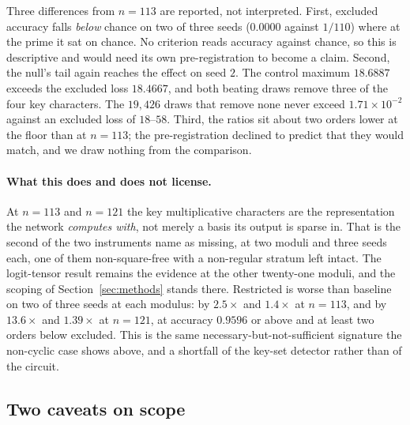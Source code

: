Three differences from $n = 113$ are reported, not interpreted. First, excluded accuracy falls
\emph{below} chance on two of three seeds ($0.0000$ against $1/110$) where at the prime it sat
on chance. No criterion reads accuracy against chance, so this is descriptive and would need
its own pre-registration to become a claim. Second, the null's tail again reaches the effect
on seed $2$. The control maximum $18.6887$ exceeds the excluded loss $18.4667$, and both
beating draws remove three of the four key characters. The $19{,}426$ draws that remove none
never exceed $1.71 \times 10^{-2}$ against an excluded loss of $18$--$58$. Third, the ratios
sit about two orders lower at the floor than at $n = 113$; the pre-registration declined to
predict that they would match, and we draw nothing from the comparison.

\paragraph{What this does and does not license.} At $n = 113$ and $n = 121$ the key
multiplicative characters are the representation the network \emph{computes with}, not merely
a basis its output is sparse in. That is the second of the two instruments
\citet{chen2026multiplication} name as missing, at two moduli and three seeds each, one of
them non-square-free with a non-regular stratum left intact. The logit-tensor result remains
the evidence at the other twenty-one moduli, and the scoping of Section~\ref{sec:methods}
stands there. Restricted is worse than baseline on two of three seeds at each modulus: by
$2.5\times$ and $1.4\times$ at $n = 113$, and by $13.6\times$ and $1.39\times$ at $n = 121$, at
accuracy $0.9596$ or above and at least two orders below excluded. This is the same
necessary-but-not-sufficient signature the non-cyclic case shows above, and a shortfall of the
key-set detector rather than of the circuit.

\subsection{Two caveats on scope}
\label{sec:causal-caveats}

